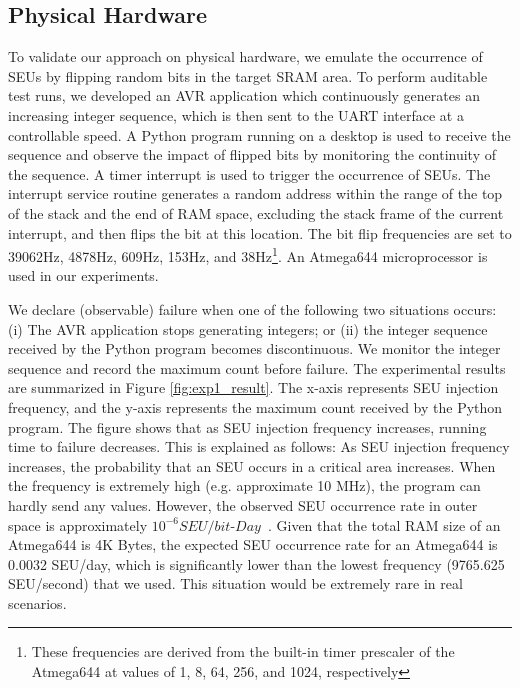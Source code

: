 \subsection{Physical Hardware}
To validate our approach on physical hardware, we emulate the occurrence of SEUs by flipping random bits in the target SRAM area. To perform auditable test runs, we developed an AVR application which continuously generates an increasing integer sequence, which is then sent to the UART interface at a controllable speed. A Python program running on a desktop is used to receive the sequence and observe the impact of flipped bits by monitoring the continuity of the sequence. A timer interrupt is used to trigger the occurrence of SEUs. The interrupt service routine generates a random address within the range of the top of the stack and the end of RAM space, excluding the stack frame of the current interrupt, and then flips the bit at this location. The bit flip frequencies are set to 39062Hz, 4878Hz, 609Hz, 153Hz, and 38Hz\footnote{These frequencies are derived from the built-in timer prescaler of the Atmega644 at values of 1, 8, 64, 256, and 1024, respectively}. An Atmega644 microprocessor is used in our experiments.

We declare (observable) failure when one of the following two situations occurs: (i) The AVR application stops generating integers; or (ii) the integer sequence received by the Python program becomes discontinuous. We monitor the integer sequence and record the maximum count before failure. The experimental results are summarized in Figure \ref{fig:exp1_result}. The x-axis represents SEU injection frequency, and the y-axis represents the maximum count received by the Python program. The figure shows that as SEU injection frequency increases, running time to failure decreases. This is explained as follows: As SEU injection frequency increases, the probability that an SEU occurs in a critical area increases. When the frequency is extremely high (e.g. approximate 10 MHz), the program can hardly send any values. However, the observed SEU occurrence rate in outer space is approximately $10^{-6}SEU/bit$-$Day$~\cite{underwood1992observations}. Given that the total RAM size of an Atmega644 is 4K Bytes, the expected SEU occurrence rate for an Atmega644 is 0.0032 SEU/day, which is significantly lower than the lowest frequency (9765.625 SEU/second) that we used. This situation would be extremely rare in real scenarios.

